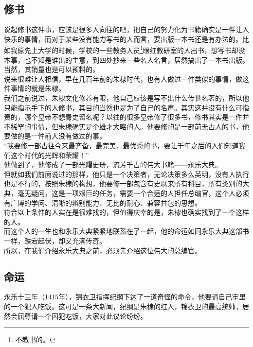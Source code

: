 \begin{multicols}{\theparacolNo}
\subsection{修书}
说起修书这件事，应该是很多人向往的吧，把自己的努力化为书籍确实是一件让人快乐的事情，而对于某些没有能力写书的人而言，要出版一本书还是有办法的。比如我原先上大学的时候，学校的一些教务人员\footnote{不教书的。}眼红教研室的人出书，想写书却没本事，也不知是谁出的主意，到四处抄来一些名人名言，居然搞出了一本书出版。当然，其销量也是可以预料的。\\

说来很难让人相信，早在几百年前的朱棣时代，也有人做过一件类似的事情，做这件事情的就是朱棣。\\

我们之前说过，朱棣文化修养有限，他自己应该是写不出什么传世名著的，所以他只能指示手下的人修书，其目的当然也是为了自己的名声。其实这并没有什么可指责的，哪个皇帝不想青史留名呢？以往的很多皇帝修了很多书，修书其实是一件并不稀罕的事情，但朱棣确实是个雄才大略的人。他要修的是一部前无古人的书，他要做的是一件前人没有做过的事。\\

“我要修一部古往今来最齐备，最完美、最优秀的书，要让千年之后的人们知道我们这个时代的光辉和荣耀！”\\

他做到了，他修成了一部光耀史册，流芳千古的伟大书籍——永乐大典。\\

但就如我们前面说过的那样，他只是一个决策者，无论决策多么英明，没有人执行也是不行的，按照朱棣的构想，他要修一部包含有史以来所有科目，所有类别的大典，毫无疑问，这是一项艰巨的任务，需要一个合适的人担任总编官，这个人必须有广博的学问、清晰的辨别能力、无比的耐心、兼容并包的思想。\\

符合以上条件的人实在是很难找的，但值得庆幸的是，朱棣也确实找到了一个这样的人。\\

而这个人的一生也和永乐大典紧紧地联系在了一起，他的命运如同永乐大典这部书一样，跌宕起伏，却又充满传奇。\\

所以，在我们介绍永乐大典之前，必须先介绍这位伟大的总编官。\\

\subsection{命运}
永乐十三年（1415年），锦衣卫指挥纪纲下达了一道奇怪的命令，他要请自己牢里的一个犯人吃饭。这可是一条大新闻，纪纲是朱棣的红人，锦衣卫的最高统帅，居然会屈尊请一个囚犯吃饭，大家对此议论纷纷。\\


\end{multicols}
